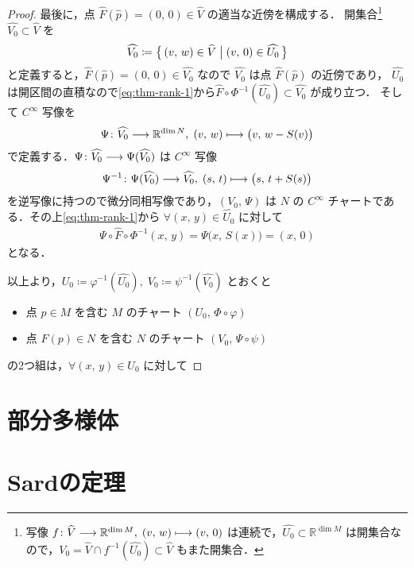 \documentclass[TQFT_main]{subfiles}
\begin{document}
\begin{proof}
    最後に，点 $\widehat{F} (\widehat{p}) = (0,\, 0) \in \widehat{V}$ の適当な近傍を構成する．
    開集合\footnote{写像 $f \colon \widehat{V} \longrightarrow \mathbb{R}^{\dim M},\; (v,\, w) \longmapsto (v,\, 0)$ は連続で，$\widehat{U_0} \subset \mathbb{R}^{\dim M}$ は開集合なので，$V_0 = \widehat{V} \cap f^{-1}(\widehat{U_0}) \subset \widehat{V}$ もまた開集合．} 
    $\widehat{V_0} \subset \widehat{V}$ を
    \begin{align}
        \widehat{V_0} \coloneqq \bigl\{\, (v,\, w) \in \widehat{V} \bigm| (v,\, 0) \in \widehat{U_0} \,\bigr\} 
    \end{align}
    と定義すると，$\widehat{F} (\widehat{p}) = (0,\, 0) \in \widehat{V_0}$ なので $\widehat{V_0}$ は点 $\widehat{F} (\widehat{p})$ の近傍であり，
    $\widehat{U_0}$ は開区間の直積なので\eqref{eq:thm-rank-1}から$\widehat{F} \circ \Phi^{-1}(\widehat{U_0}) \subset \widehat{V_0}$ が成り立つ．
    そして $C^\infty$ 写像を
    \begin{align}
        \Psi \colon \widehat{V_0} \longrightarrow \mathbb{R}^{\dim N},\; (v,\, w) \longmapsto \bigl( v,\, w - S(v) \bigr) 
    \end{align}
    で定義する．$\Psi \colon \widehat{V_0} \longrightarrow \Psi(\widehat{V_0})$ は $C^\infty$ 写像
    \begin{align}
        \Psi^{-1} \colon \Psi(\widehat{V_0}) \longrightarrow \widehat{V_0},\; (s,\, t) \longmapsto \bigl( s,\, t + S(s) \bigr) 
    \end{align}
    を逆写像に持つので微分同相写像であり，$(V_0,\, \Psi)$ は $N$ の $C^\infty$ チャートである．その上\eqref{eq:thm-rank-1}から $\forall (x,\, y) \in \widehat{U_0}$ に対して
    \begin{align}
        \Psi \circ \widehat{F} \circ \Phi^{-1}(x,\, y) = \Psi\bigl(x,\, S(x)\bigr) = (x,\, 0)
    \end{align}
    となる．

    以上より，$U_0 \coloneqq \varphi^{-1}(\widehat{U_0}),\; V_0 \coloneqq \psi^{-1} (\widehat{V_0})$ とおくと
    \begin{itemize}
        \item 点 $p \in M$ を含む $M$ のチャート $(U_0,\, \Phi \circ \varphi)$
        \item 点 $F(p) \in N$ を含む $N$ のチャート $(V_0,\, \Psi \circ \psi)$
    \end{itemize}
    の2つ組は，$\forall (x,\, y) \in U_0$ に対して
\end{proof}


\section{部分多様体}
\section{Sardの定理}
\end{document}
